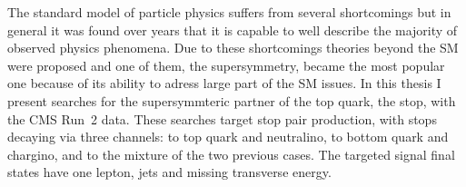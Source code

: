 




The standard model of particle physics suffers from several shortcomings but in general it was found over years that it is capable to well describe the majority of observed physics phenomena. Due to these shortcomings theories beyond the SM were proposed and one of them, the supersymmetry, became the most popular one because of its ability to adress large part of the SM issues. In this thesis I present searches for the supersymmteric partner of the top quark, the stop, with the CMS Run~2 data. These searches target stop pair production, with stops decaying via three channels: to top quark and neutralino, to bottom quark and chargino, and to the mixture of the two previous cases.  The targeted signal final states have one lepton, jets and missing transverse energy. 

